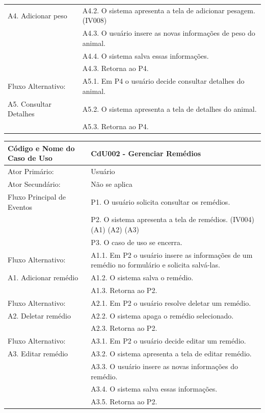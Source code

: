 \documentclass[12pt]{article}
\begin{document}
\begin{titlepage}
\begin{center}
\begin{tabular}{ | l |  p{10cm} |}
    A4. Adicionar peso         & A4.2. O sistema apresenta a tela de adicionar pesagem. (IV008) \\
			       & A4.3. O usuário insere as novas informações de peso do animal. \\
                               & A4.4. O sistema salva essas informações. \\
			       & A4.3. Retorna ao P4. \\ \hline
    Fluxo Alternativo:         & A5.1. Em P4 o usuário decide consultar detalhes do animal. \\
    A5. Consultar Detalhes     & A5.2. O sistema apresenta a tela de detalhes do animal. \\
			       & A5.3. Retorna ao P4. \\
    \hline
  \end{tabular}
\end{center}


\begin{center}
  \begin{tabular}{ | l |  p{10cm} |}
    \hline
    Código e Nome do Caso de Uso & CdU002 - Gerenciar Remédios \\ \hline
    Ator Primário: & Usuário \\ 
    Ator Secundário: & Não se aplica \\ \hline
    Fluxo Principal de Eventos & P1. O usuário solicita consultar os remédios. \\
			       & P2. O sistema apresenta a tela de remédios. (IV004) (A1) (A2) (A3) \\
                               & P3. O caso de uso se encerra. \\ \hline
    Fluxo Alternativo:         & A1.1. Em P2 o usuário insere as informações de um remédio no formulário e solicita salvá-las. \\
    A1. Adicionar remédio      & A1.2. O sistema salva o remédio. \\ 
			       & A1.3. Retorna ao P2. \\ \hline
    Fluxo Alternativo:         & A2.1. Em P2 o usuário resolve deletar um remédio. \\
    A2. Deletar remédio        & A2.2. O sistema apaga o remédio selecionado. \\
			       & A2.3. Retorna ao P2. \\ \hline
    Fluxo Alternativo:         & A3.1. Em P2 o usuário decide editar um remédio. \\
    A3. Editar remédio         & A3.2. O sistema apresenta a tela de editar remédio. \\
			       & A3.3. O usuário insere as novas informações do remédio. \\
                               & A3.4. O sistema salva essas informações. \\
			       & A3.5. Retorna ao P2. \\
    \hline
  \end{tabular}
\end{center}



\end{titlepage}
\end{document}
